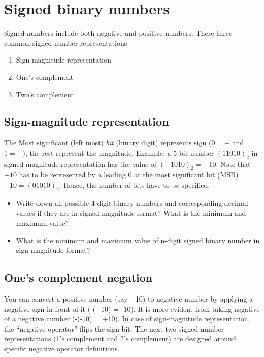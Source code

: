 \maketitle
\section{Signed binary numbers}

Signed numbers include both negative and positive numbers. There three common
signed number representations

\begin{enumerate}
\item Sign magnitude representation
\item One's complement
\item Two's complement
\end{enumerate}
  
\subsection{Sign-magnitude representation}
The Most significant (left most) \emph{bit} (binary digit) represents sign ($0 =
+$ and $1 = -$), the rest represent the magnitude. Example, a 5-bit number
$(11010)_2$ in signed magnitude representation has the value of $(-1010)_2 =
-10$. Note that $+10$ has to be represented by a leading $0$ at the most
significant bit (MSB) $+10 = (01010)_2$. Hence, the number of bits have to be specified.

\begin{prob}
  \begin{itemize}
\item Write down all possible 4-digit binary numbers and corresponding decimal
  values if they are in signed magnitude format? What is the minimum and maximum value?
  \item What is the minimum and maximum value of n-digit signed binary number in
    sign-magnitude format?
\end{itemize}
\end{prob}

\vspace{20em}

\subsection{One's complement negation}

You can convert a positive number (say +10) to negative number by applying a
negative sign in front of it (-(+10) = -10). It is more evident from taking
negative of a negative number (-(-10) = +10). In case of sign-magnitude
representation, the ``negative operator'' flips the sign bit. The next two
signed number representations (1's complement and 2's complement) are designed
around specific negative operator definitions.

